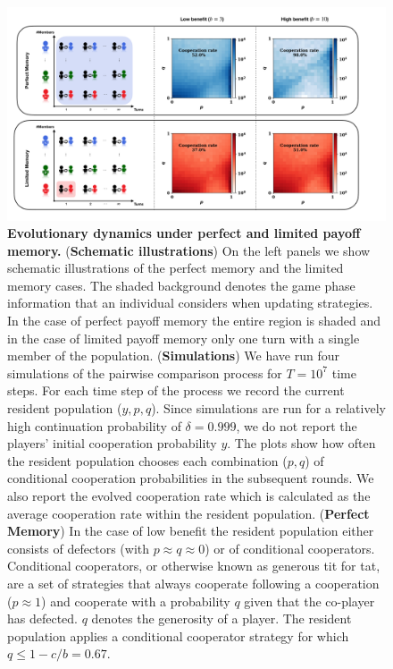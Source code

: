 \documentclass[11pt]{article}
\theoremstyle{plainCl1}
\theoremstyle{plainCl2}
\begin{document}
\begin{figure}[!htbp]
    \centering
    \includegraphics[width=.9\textwidth]{static/donation_expected_last_round_summary_results.pdf}
    \caption{{\bf Evolutionary dynamics under perfect and limited payoff memory.}
    ({\bf Schematic illustrations}) On the left panels we show schematic
    illustrations of the perfect memory and the limited memory cases. The shaded
    background denotes the game phase information that an individual considers
    when updating strategies. In the case of perfect payoff memory the entire region is
    shaded and in the case of limited payoff memory only one turn with a single member
    of the population. ({\bf Simulations}) We have run four simulations of the
    pairwise comparison process for $T\!=\!10^7$ time steps. For each time step
    of the process
    we record the current resident population ($y,p,q$). Since
    simulations are run for a relatively high continuation probability of
    $\delta\!=\!0.999$, we do not report the players' initial cooperation
    probability $y$. The plots show how often the resident population chooses
    each combination ($p,q$) of conditional cooperation probabilities in the
    subsequent rounds. We also report the evolved cooperation rate which is
    calculated as the average cooperation rate within the resident population.
    ({\bf Perfect Memory}) In the case of low benefit the resident population
    either consists of defectors (with $p\!\approx\!q\!\approx\!0$) or of
    conditional cooperators. Conditional cooperators, or otherwise known as
    generous tit for tat, are a set of strategies that always cooperate
    following a cooperation ($p\!\approx\!1\!$) and cooperate with a probability
    $q$ given that the co-player has defected. $q$ denotes the generosity of a
    player. The resident population applies a conditional cooperator strategy
    for which $q\!\le\!1\!-\!c/b\!=\!0.67$. 
}
\end{figure}
\end{document}
